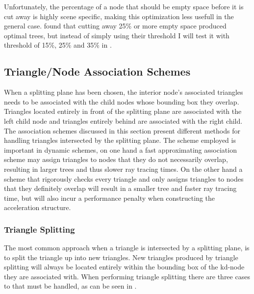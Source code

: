 Unfortunately, the percentage of a node that should be empty space before it is
cut away is highly scene specific, making this optimization less usefull in the
general case. \zhou{} found that cutting away 25\% or more empty space produced
optimal trees, but instead of simply using their threshold I will test it with
threshold of 15\%, 25\% and 35\% in .




\subsection{Triangle/Node Association Schemes}\label{sec:splittingSchemes}

When a splitting plane has been chosen, the interior node's associated triangles
needs to be associated with the child nodes whose bounding box they
overlap. Triangles located entirely in front of the splitting plane are
associated with the left child node and triangles entirely behind are associated
with the right child. The association schemes discussed in this section present
different methods for handling triangles intersected by the splitting plane. The
scheme employed is important in dynamic schemes, on one hand a fast
approximating association scheme may assign triangles to nodes that they do not
necessarily overlap, resulting in larger trees and thus slower ray tracing
times. On the other hand a scheme that rigorously checks every triangle and only
assigns triangles to nodes that they definitely overlap will result in a smaller
tree and faster ray tracing time, but will also incur a performance penalty when
constructing the acceleration structure.



\subsubsection{Triangle Splitting}


The most common approach when a triangle is intersected by a splitting plane, is
to split the triangle up into new triangles. New triangles produced by triangle
splitting will always be located entirely within the bounding box of the kd-node
they are associated with. When performing triangle splitting there are three
cases to that must be handled, as can be seen in .

